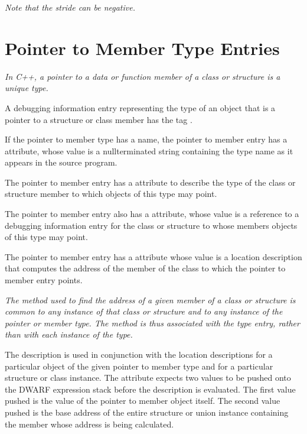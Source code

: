 \textit{Note that the stride can be negative.}

\section{Pointer to Member Type Entries}
\label{chap:pointertomembertypeentries}

\textit{In C++, a pointer to a data or function member of a class or
structure is a unique type.}

A debugging information entry representing the type of an
object that is a pointer to a structure or class member has
the tag .

If the pointer to member type has a name, the pointer to
member entry has a  attribute, whose value is a
null\dash terminated string containing the type name as it appears
in the source program.

The pointer to member entry has a  attribute to
describe the type of the class or structure member to which
objects of this type may point.

The pointer to member entry also has a 
attribute, whose value is a reference to a debugging
information entry for the class or structure to whose members
objects of this type may point.

The pointer to member entry has a  attribute
whose value is a location description that computes the
address of the member of the class to which the pointer to
member entry points.

\textit{The method used to find the address of a given member of a
class or structure is common to any instance of that class
or structure and to any instance of the pointer or member
type. The method is thus associated with the type entry,
rather than with each instance of the type.}

The  description is used in conjunction
with the location descriptions for a particular object of the
given pointer to member type and for a particular structure or
class instance. The  attribute expects two
values to be pushed onto the DWARF expression stack before
the  description is evaluated. The first
value pushed is the value of the pointer to member object
itself. The second value pushed is the base address of the
entire structure or union instance containing the member
whose address is being calculated.

